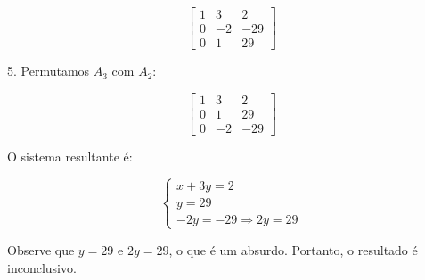 \documentclass[a4paper,12pt]{article}
\begin{document}
\[
\begin{bmatrix}
1 & 3 & 2 \\
0 & -2 & -29 \\
0 & 1 & 29
\end{bmatrix}
\]

5. Permutamos \( A_3 \) com \( A_2 \):

\[
\begin{bmatrix}
1 & 3 & 2 \\
0 & 1 & 29 \\
0 & -2 & -29
\end{bmatrix}
\]

O sistema resultante é:

\[
\begin{cases}
x + 3y = 2 \\
y = 29 \\
-2y = -29 \Rightarrow 2y = 29
\end{cases}
\]

Observe que \( y = 29 \) e \( 2y = 29 \), o que é um absurdo. Portanto, o resultado é inconclusivo.
\end{document}
